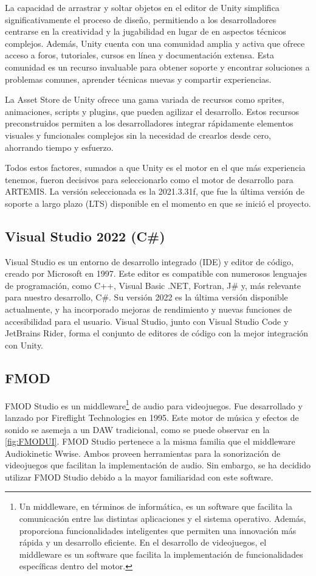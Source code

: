 La capacidad de arrastrar y soltar objetos en el editor de Unity simplifica significativamente el proceso de diseño, permitiendo a los desarrolladores centrarse en la creatividad y la jugabilidad en lugar de en aspectos técnicos complejos. Además, Unity cuenta con una comunidad amplia y activa que ofrece acceso a foros, tutoriales, cursos en línea y documentación extensa. Esta comunidad es un recurso invaluable para obtener soporte y encontrar soluciones a problemas comunes, aprender técnicas nuevas y compartir experiencias.

La Asset Store de Unity ofrece una gama variada de recursos como sprites, animaciones, scripts y plugins, que pueden agilizar el desarrollo. Estos recursos preconstruidos permiten a los desarrolladores integrar rápidamente elementos visuales y funcionales complejos sin la necesidad de crearlos desde cero, ahorrando tiempo y esfuerzo.

Todos estos factores, sumados a que Unity es el motor en el que más experiencia tenemos, fueron decisivos para seleccionarlo como el motor de desarrollo para ARTEMIS. La versión seleccionada es la 2021.3.31f, que fue la última versión de soporte a largo plazo (LTS) disponible en el momento en que se inició el proyecto.

\subsection{Visual Studio 2022 (C\#)}

Visual Studio es un entorno de desarrollo integrado (IDE) y editor de código, creado por Microsoft en 1997. Este editor es compatible con numerosos lenguajes de programación, como C++, Visual Basic .NET, Fortran, J\# y, más relevante para nuestro desarrollo, C\#. Su versión 2022 es la última versión disponible actualmente, y ha incorporado mejoras de rendimiento y nuevas funciones de accesibilidad para el usuario. Visual Studio, junto con Visual Studio Code y JetBrains Rider, forma el conjunto de editores de código con la mejor integración con Unity.

\subsection{FMOD}

FMOD Studio es un middleware\footnote{Un middleware, en términos de informática, es un software que facilita la comunicación entre las distintas aplicaciones y el sistema operativo. Además, proporciona funcionalidades inteligentes que permiten una innovación más rápida y un desarrollo eficiente. En el desarrollo de videojuegos, el middleware es un software que facilita la implementación de funcionalidades específicas dentro del motor.} de audio para videojuegos. Fue desarrollado y lanzado por Fireflight Technologies en 1995. Este motor de música y efectos de sonido se asemeja a un DAW tradicional, como se puede observar en la \autoref{fig:FMODUI}. FMOD Studio pertenece a la misma familia que el middleware Audiokinetic Wwise. Ambos proveen herramientas para la sonorización de videojuegos que facilitan la implementación de audio. Sin embargo, se ha decidido utilizar FMOD Studio debido a la mayor familiaridad con este software.

